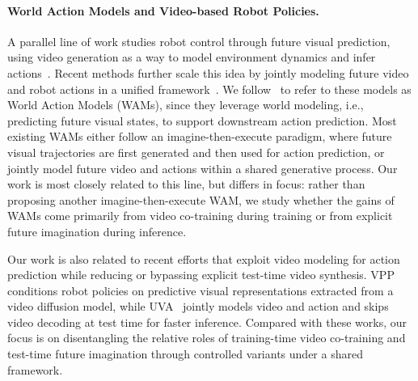 \documentclass{article}
\begin{document}
\paragraph{World Action Models and Video-based Robot Policies.}
A parallel line of work studies robot control through future visual prediction, using video generation as a way to model environment dynamics and infer actions~\cite{du2023learninguniversalpoliciestextguided, wu2023unleashing, zhou2024robodreamer, feng2025vidarembodiedvideodiffusion, bharadhwaj2024gen2act, won2025dualstreamdiffusionworldmodelaugmented, cheang2024gr2generativevideolanguageactionmodel, jang2025dreamgenunlockinggeneralizationrobot, zhao2025cotvlavisualchainofthoughtreasoning, cen2025rynnvla, cen2025WorldVLA, zhou2025act2goalworldmodelgeneral, zheng2025flarerobotlearningimplicit, dreamvla25}. Recent methods further scale this idea by jointly modeling future video and robot actions in a unified framework~\cite{zhu2025unifiedworldmodelscoupling, liang2025videogenerators, kim2026cosmos, ge2025, pai2025mimicvideo, lingbot-va2026, bi2025motusunifiedlatentaction, ye2026worldactionmodelszeroshot}. We follow~\cite{ye2026worldactionmodelszeroshot} to refer to these models as World Action Models (WAMs), since they leverage world modeling, i.e., predicting future visual states, to support downstream action prediction. Most existing WAMs either follow an imagine-then-execute paradigm, where future visual trajectories are first generated and then used for action prediction, or jointly model future video and actions within a shared generative process. Our work is most closely related to this line, but differs in focus: rather than proposing another imagine-then-execute WAM, we study whether the gains of WAMs come primarily from video co-training during training or from explicit future imagination during inference.

Our work is also related to recent efforts that exploit video modeling for action prediction while reducing or bypassing explicit test-time video synthesis. VPP~\cite{hu2024video} conditions robot policies on predictive visual representations extracted from a video diffusion model, while UVA~\cite{li2025unified} jointly models video and action and skips video decoding at test time for faster inference. Compared with these works, our focus is on disentangling the relative roles of training-time video co-training and test-time future imagination through controlled variants under a shared framework.


\end{document}
